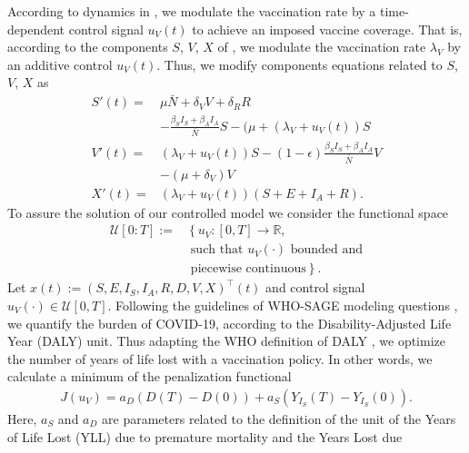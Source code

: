 According to dynamics in , we
modulate the vaccination rate by a
time-dependent control signal $u_V(t)$ to
achieve an imposed vaccine coverage. That is,
according to the components $S$,
$V$, $X$ of , we modulate the
vaccination rate $\lambda_V$ by an additive control $u_V(t)$. Thus,
we modify components equations related to $S$, $V$, $X$ as
\begin{equation}
    \label{eqn:counter}
    \begin{aligned}
        S'(t)  = &
            \mu \bar{N} + \delta_V V + \delta_R R
            \\
            &
            - \frac{\beta_S I_S + \beta_AI_A}{\bar{N}}S
            - (\mu + (\lambda_V + u_V(t)) S
        \\
        V'(t) = &
            (\lambda_V + u_V(t)) S-(1-\epsilon)
            \frac{\beta_S I_S + \beta_A I_A}{\bar{N}}V
        \\
            &-
             (\mu+\delta_V) V
        \\
        X'(t) =&
        (\lambda_V + u_V(t)) (S + E + I_A + R).
    \end{aligned}
\end{equation}
To assure the solution of our controlled model
we consider the functional space
\begin{align*}
    \mathcal{U}[0:T] := &
    \left\{
        u_V: [0, T] \to \mathbb{R},
    \right.
        \\
        &
        \text{ such that $u_V(\cdot)$ bounded and}
        \\
        &
    \left.
        \text{ piecewise continuous}
    \right \}.
\end{align*}
%
Let ${x(t):= (S,E,I_S,I_A,R,D,V,X)^{\top}(t)}$
and control signal $u_V(\cdot)\in \mathcal{U}[0, T]$.
Following the guidelines of
WHO-SAGE modeling questions \cite{sage2020},
we quantify the burden of COVID-19, according
to the Disability-Adjusted Life Year (DALY) unit. Thus adapting the
WHO
definition of DALY \cite{WhoDALY}, we optimize the number of years of
life lost
with a vaccination policy. In other words, we calculate a minimum of
the penalization functional
\begin{align}
    \label{eqn:cost_functional}
    J(u_V) =
    a_D ( D(T) - D(0)) +
    a_S (Y_{I_S}(T) - Y_{I_S}(0)).
\end{align}
Here, $a_S$ and $a_D$ are parameters related to the definition of the unit of
the Years of Life Lost (YLL) due to premature mortality and the Years Lost due
